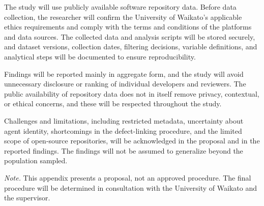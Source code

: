 \documentclass[stu,12pt,donotrepeattitle]{apa7}
\begin{document}
The study will use publicly available software repository data. Before data collection, the researcher will confirm the University of Waikato's applicable ethics requirements and comply with the terms and conditions of the platforms and data sources. The collected data and analysis scripts will be stored securely, and dataset versions, collection dates, filtering decisions, variable definitions, and analytical steps will be documented to ensure reproducibility.

Findings will be reported mainly in aggregate form, and the study will avoid unnecessary disclosure or ranking of individual developers and reviewers. The public availability of repository data does not in itself remove privacy, contextual, or ethical concerns, and these will be respected throughout the study.

Challenges and limitations, including restricted metadata, uncertainty about agent identity, shortcomings in the defect-linking procedure, and the limited scope of open-source repositories, will be acknowledged in the proposal and in the reported findings. The findings will not be assumed to generalize beyond the population sampled.

\textit{Note.} This appendix presents a proposal, not an approved procedure. The final procedure will be determined in consultation with the University of Waikato and the supervisor.
\end{document}
